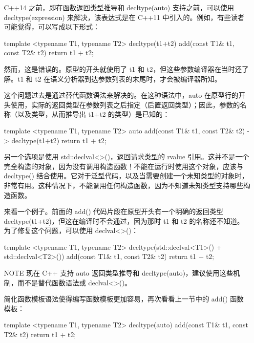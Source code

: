 C++14 之前，即在函数返回类型推导和 decltype(auto) 支持之前，可以使用 decltype(expression) 来解决，该表达式是在 C++11 中引入的。例如，有些读者可能觉得，可以写成以下形式：

\begin{cpp}
template <typename T1, typename T2>
decltype(t1+t2) add(const T1& t1, const T2& t2) { return t1 + t2; }
\end{cpp}

然而，这是错误的。原型的开头就使用了 t1 和 t2，但这些参数编译器在当时还了解。t1 和 t2 在语义分析器到达参数列表的末尾时，才会被编译器所知。

这个问题过去是通过替代函数语法来解决的。在这种语法中，auto 在原型行的开头使用，实际的返回类型在参数列表之后指定（后置返回类型）；因此，参数的名称（以及类型，从而推导出 t1+t2 的类型）是已知的：

\begin{cpp}
template <typename T1, typename T2>
auto add(const T1& t1, const T2& t2) -> decltype(t1+t2)
{
    return t1 + t2;
}
\end{cpp}

另一个选项是使用 std::declval<>()，返回请求类型的 rvalue 引用。这并不是一个完全构造的对象，因为没有调用构造函数！不能在运行时使用这个对象，应该与 decltype() 结合使用。它对于泛型代码，以及当需要创建一个未知类型的对象时，非常有用。这种情况下，不能调用任何构造函数，因为不知道未知类型支持哪些构造函数。

来看一个例子。前面的 add() 代码片段在原型开头有一个明确的返回类型 decltype(t1+t2)，但这在编译时不会通过，因为那时 t1 和 t2 的名称还不知道。为了修复这个问题，可以使用 declval<>()：

\begin{cpp}
template <typename T1, typename T2>
decltype(std::declval<T1>() + std::declval<T2>()) add(const T1& t1, const T2& t2)
{
    return t1 + t2;
}
\end{cpp}

\begin{myNotic}{NOTE}
现在 C++ 支持 auto 返回类型推导和 decltype(auto)，建议使用这些机制，而不是替代函数语法或 declval<>()。
\end{myNotic}


简化函数模板语法使得编写函数模板更加容易，再次看看上一节中的 add() 函数模板：

\begin{cpp}
template <typename T1, typename T2>
decltype(auto) add(const T1& t1, const T2& t2) { return t1 + t2; }
\end{cpp}

